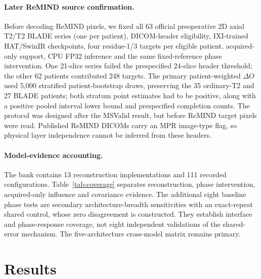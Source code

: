 \documentclass[10pt,twocolumn,letterpaper]{article}
\begin{document}
\paragraph{Later ReMIND source confirmation.}
Before decoding ReMIND pixels, we fixed all 63 official preoperative 2D axial T2/T2 BLADE series (one per patient), DICOM-header eligibility, IXI-trained HAT/SwinIR checkpoints, four residue-1/3 targets per eligible patient, acquired-only support, CPU FP32 inference and the same fixed-reference phase intervention. One 21-slice series failed the prespecified 24-slice header threshold; the other 62 patients contributed 248 targets. The primary patient-weighted $\Delta O$ used 5,000 stratified patient-bootstrap draws, preserving the 35 ordinary-T2 and 27 BLADE patients; both stratum point estimates had to be positive, along with a positive pooled interval lower bound and prespecified completion counts. The protocol was designed after the MSValid result, but before ReMIND target pixels were read. Published ReMIND DICOMs carry an MPR image-type flag, so physical layer independence cannot be inferred from these headers.

\paragraph{Model-evidence accounting.}
The bank contains 13 reconstruction implementations and 111 recorded configurations. Table~\ref{tab:coverage} separates reconstruction, phase intervention, acquired-only influence and covariance evidence. The additional eight baseline phase tests are secondary architecture-breadth sensitivities with an exact-repeat shared control, whose zero disagreement is constructed. They establish interface and phase-response coverage, not eight independent validations of the shared-error mechanism. The five-architecture cross-model matrix remains primary.


\section{Results}
\end{document}
